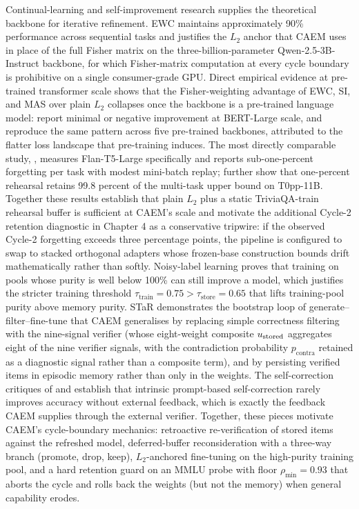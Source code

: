 Continual-learning and self-improvement research supplies the theoretical backbone for iterative refinement. EWC \cite{doi:10.1073/pnas.1611835114} maintains approximately 90\% performance across sequential tasks and justifies the $L_2$ anchor that CAEM uses in place of the full Fisher matrix on the three-billion-parameter Qwen-2.5-3B-Instruct backbone, for which Fisher-matrix computation at every cycle boundary is prohibitive on a single consumer-grade GPU. Direct empirical evidence at pre-trained transformer scale shows that the Fisher-weighting advantage of EWC, SI, and MAS over plain $L_2$ collapses once the backbone is a pre-trained language model: \citet{mehta2023empirical} report minimal or negative improvement at BERT-Large scale, and \citet{wu2022pretrained} reproduce the same pattern across five pre-trained backbones, attributed to the flatter loss landscape that pre-training induces. The most directly comparable study, \citet{jin2024forget}, measures Flan-T5-Large specifically and reports sub-one-percent forgetting per task with modest mini-batch replay; \citet{scialom2022fine} further show that one-percent rehearsal retains 99.8 percent of the multi-task upper bound on T0pp-11B. Together these results establish that plain $L_2$ plus a static TriviaQA-train rehearsal buffer is sufficient at CAEM's scale and motivate the additional Cycle-2 retention diagnostic in Chapter 4 as a conservative tripwire: if the observed Cycle-2 forgetting exceeds three percentage points, the pipeline is configured to swap to stacked orthogonal adapters \citep{wang2023olora,biderman2024lora} whose frozen-base construction bounds drift mathematically rather than softly. Noisy-label learning \cite{natarajan2013learning} proves that training on pools whose purity is well below 100\% can still improve a model, which justifies the stricter training threshold $\tau_{\text{train}} = 0.75 > \tau_{\text{store}} = 0.65$ that lifts training-pool purity above memory purity. STaR \cite{NEURIPS2022_639a9a17} demonstrates the bootstrap loop of generate--filter--fine-tune that CAEM generalises by replacing simple correctness filtering with the nine-signal verifier (whose eight-weight composite $u_{\text{stored}}$ aggregates eight of the nine verifier signals, with the contradiction probability $p_{\text{contra}}$ retained as a diagnostic signal rather than a composite term), and by persisting verified items in episodic memory rather than only in the weights. The self-correction critiques of \citet{huang-etal-2023-large} and \citet{kamoi-etal-2024-llms} establish that intrinsic prompt-based self-correction rarely improves accuracy without external feedback, which is exactly the feedback CAEM supplies through the external verifier. Together, these pieces motivate CAEM's cycle-boundary mechanics: retroactive re-verification of stored items against the refreshed model, deferred-buffer reconsideration with a three-way branch (promote, drop, keep), $L_2$-anchored fine-tuning on the high-purity training pool, and a hard retention guard on an MMLU probe with floor $\rho_{\min} = 0.93$ that aborts the cycle and rolls back the weights (but not the memory) when general capability erodes.

